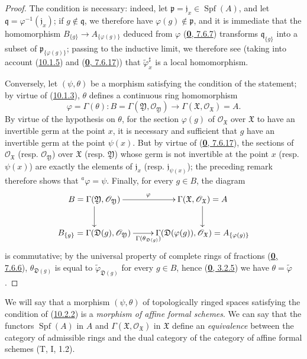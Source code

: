 \begin{proof}
The condition is necessary: indeed, let
$\mathfrak{p}=\mathfrak{j}_x\in\operatorname{Spf}(A)$, and let
$\mathfrak{q}=\varphi^{-1}(\mathfrak{j}_x)$; if
$g\notin\mathfrak{q}$, we therefore have $\varphi(g)\notin\mathfrak{p}$, and it
is immediate that the homomorphism
$B_{\{g\}}\to A_{\{\varphi(g)\}}$ deduced from $\varphi$
(\hyperref[0.7.6.7]{\textbf{0}, 7.6.7}) transforms
$\mathfrak{q}_{\{g\}}$ into a subset of
$\mathfrak{p}_{\{\varphi(g)\}}$; passing to the inductive limit, we
therefore see (taking into account (\hyperref[I.10.1.5]{10.1.5}) and
(\hyperref[0.7.6.17]{\textbf{0}, 7.6.17})) that
$\widetilde{\varphi}_x^\sharp$ is a local homomorphism.

Conversely, let $(\psi,\theta)$ be a morphism satisfying the condition of
the statement; by virtue of (\hyperref[I.10.1.3]{10.1.3}), $\theta$
defines a continuous ring homomorphism
\[
  \varphi=\Gamma(\theta):
  B=\Gamma(\mathfrak{Y},\mathscr{O}_{\mathfrak{Y}})
  \longrightarrow
  \Gamma(\mathfrak{X},\mathscr{O}_{\mathfrak{X}})=A.
\]
By virtue of the hypothesis on $\theta$, for the section $\varphi(g)$ of
$\mathscr{O}_{\mathfrak{X}}$ over $\mathfrak{X}$ to have an invertible
germ at the point $x$, it is necessary and sufficient that $g$ have an
invertible germ at the point $\psi(x)$. But by virtue of
(\hyperref[0.7.6.17]{\textbf{0}, 7.6.17}), the sections of
$\mathscr{O}_{\mathfrak{X}}$ (resp. $\mathscr{O}_{\mathfrak{Y}}$)
over $\mathfrak{X}$ (resp. $\mathfrak{Y}$) whose germ is not
invertible at the point $x$ (resp. $\psi(x)$) are exactly the elements of
$\mathfrak{j}_x$
(resp. $\mathfrak{j}_{\psi(x)}$); the preceding remark therefore shows that
${}^a\varphi=\psi$. Finally, for every $g\in B$, the diagram
\[
  \xymatrix{
    B=\Gamma(\mathfrak{Y},\mathscr{O}_{\mathfrak{Y}})
      \ar[r]^\varphi\ar[d] &
    \Gamma(\mathfrak{X},\mathscr{O}_{\mathfrak{X}})=A\ar[d]\\
    B_{\{g\}}=\Gamma(\mathfrak{D}(g),\mathscr{O}_{\mathfrak{Y}})
      \ar[r]_{\Gamma(\theta_{\mathfrak{D}(g)})} &
    \Gamma(\mathfrak{D}(\varphi(g)),\mathscr{O}_{\mathfrak{X}})
      =A_{\{\varphi(g)\}}
  }
\]
is commutative; by the universal property of complete rings of
fractions (\hyperref[0.7.6.6]{\textbf{0}, 7.6.6}),
$\theta_{\mathfrak{D}(g)}$ is equal to
$\widetilde{\varphi}_{\mathfrak{D}(g)}$ for every $g\in B$, hence
(\hyperref[0.3.2.5]{\textbf{0}, 3.2.5}) we have
$\theta=\widetilde{\varphi}$.
\end{proof}

We will say that a morphism $(\psi,\theta)$ of topologically ringed
spaces satisfying the condition of (\hyperref[I.10.2.2]{10.2.2}) is a
\emph{morphism of affine formal schemes}. We can say that the functors
$\operatorname{Spf}(A)$ in $A$ and
$\Gamma(\mathfrak{X},\mathscr{O}_{\mathfrak{X}})$ in $\mathfrak{X}$
define an \emph{equivalence} between the category of admissible rings
and the dual category of the category of affine formal schemes
(T, I, 1.2).

